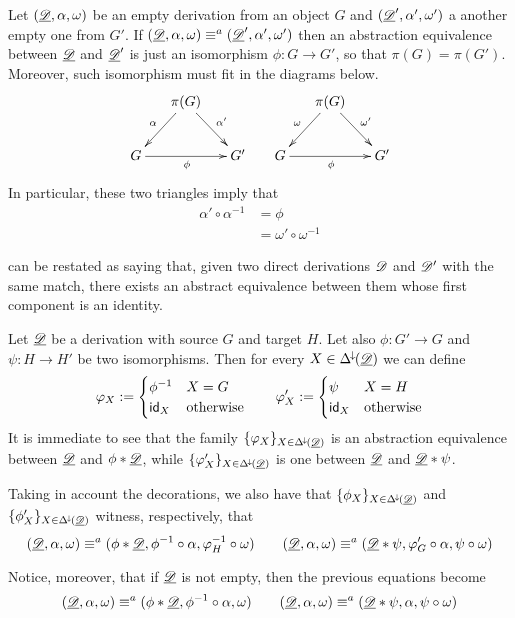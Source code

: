 \begin{example}\label{rem:empty}
	Let $(\underline{\mathscr{D}},\alpha, \omega)$ be an empty derivation from an object $G$ and  $(\underline{\mathscr{D}}',\alpha', \omega')$ a another empty one from $G'$.  If $(\underline{\mathscr{D}},\alpha, \omega)\equiv^a(\underline{\mathscr{D}}',\alpha', \omega')$ then an abstraction equivalence between $\underline{\mathscr{D}}$ and $\underline{\mathscr{D}}'$ is just an isomorphism $\phi\colon G\to G'$, so that $\pi(G)=\pi(G')$. Moreover, such isomorphism must fit in the diagrams below.
	\[\xymatrix@C=15pt{&\pi(G) \ar[dr]^{\alpha'} \ar[dl]_{\alpha}&&& \pi(G) \ar[dr]^{\omega'} \ar[dl]_{\omega}\\ G\ar[rr]_{\phi} && G' &G \ar[rr]_{\phi} && G' } \]
	In particular, these two triangles imply that
	\begin{align*}
		\alpha'\circ \alpha^{-1}&=\phi \\&=\omega'\circ \omega^{-1}
	\end{align*}
\end{example}

\begin{remark}\label{rem:res}  can be restated as saying that, given two direct derivations $\mathscr{D}$ and $\mathscr{D'}$ with the same match, there exists an abstract equivalence between them whose first component is an identity.
\end{remark}

\begin{remark}\label{rem:absequi}
	Let $\underline{\mathscr{D}}$ be a derivation with source $G$ and target $H$. Let also $\phi\colon G'\to G$ and $\psi\colon H\to H'$ be two isomorphisms. Then for every $X\in \Delta^{\hspace{-1pt}\downarrow\hspace{-1pt}}(\underline{\mathscr{D}})$ we can define 
	\[\varphi_X:=\begin{cases}
		\phi^{-1} & X=G\\
		\mathsf{id}_{X} & \text{otherwise}
	\end{cases} \qquad \varphi'_X:=\begin{cases}
		\psi & X=H\\
		\mathsf{id}_{X} & \text{otherwise}
	\end{cases}\]
	It is immediate to see that the family $\{\varphi_X\}_{X\in \Delta^{\hspace{-1pt}\downarrow\hspace{-1pt}}(\underline{\mathscr{D}})}$ is an abstraction equivalence between $\underline{\mathscr{D}}$ and $\phi *\underline{\mathscr{D}}$, while $\{\varphi'_X\}_{X\in \Delta^{\hspace{-1pt}\downarrow\hspace{-1pt}}(\underline{\mathscr{D}})}$ is one between $\underline{\mathscr{D}}$ and $\underline{\mathscr{D}}*\psi$.  
	
	Taking in account the decorations, we also have that $\{\phi_X\}_{X\in \Delta^{\hspace{-1pt}\downarrow\hspace{-1pt}}(\underline{\mathscr{D}})}$ and  $\{\phi'_X\}_{X\in \Delta^{\hspace{-1pt}\downarrow\hspace{-1pt}}(\underline{\mathscr{D}})}$ witness, respectively, that 
	\[(\underline{\mathscr{D}}, \alpha, \omega) \equiv^a (\phi * \underline{\mathscr{D}}, \phi^{-1}\circ \alpha,   \varphi^{-1}_{H} \circ \omega) \qquad (\underline{\mathscr{D}}, \alpha, \omega) \equiv^a ( \underline{\mathscr{D}}*\psi, \varphi'_{G} \circ \alpha, \psi \circ \omega )\]

Notice, moreover, that if $\underline{\mathscr{D}}$ is not empty, then the previous equations become
\[(\underline{\mathscr{D}}, \alpha, \omega) \equiv^a (\phi * \underline{\mathscr{D}}, \phi^{-1}\circ \alpha,   \omega) \qquad (\underline{\mathscr{D}}, \alpha, \omega) \equiv^a ( \underline{\mathscr{D}}*\psi, \alpha, \psi \circ \omega )\]
\end{remark}

